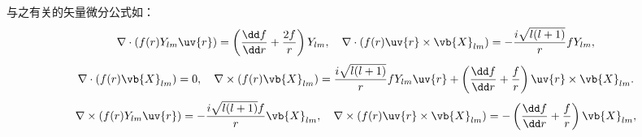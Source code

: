 与之有关的矢量微分公式如：
\begin{align*}
	\nabla \cdot \left(f(r) Y_{lm} \uv{r}\right) = \left(\frac{\dd f}{\dd r} + \frac{2f}{r}\right) Y_{lm},\quad
	\nabla \cdot \left(f(r) \uv{r} \times \vb{X}_{lm}\right) = -\frac{i\sqrt{l(l+1)}}{r} f Y_{lm},
\end{align*}
\begin{align*}
	\nabla \cdot \left(f(r) \vb{X}_{lm}\right) = 0,\quad \nabla \times \left(f(r) \vb{X}_{lm}\right) = \frac{i\sqrt{l(l+1)}}{r} f Y_{lm} \uv{r} + \left(\frac{\dd f}{\dd r} + \frac{f}{r}\right) \uv{r} \times \vb{X}_{lm}.
\end{align*}
\begin{align*}
	\nabla \times \left(f(r) Y_{lm} \uv{r}\right) = -\frac{i\sqrt{l(l+1)} f}{r} \vb{X}_{lm},\quad
	\nabla \times \left(f(r) \uv{r} \times \vb{X}_{lm}\right) = -\left(\frac{\dd f}{\dd r} + \frac{f}{r}\right) \vb{X}_{lm},
\end{align*}

